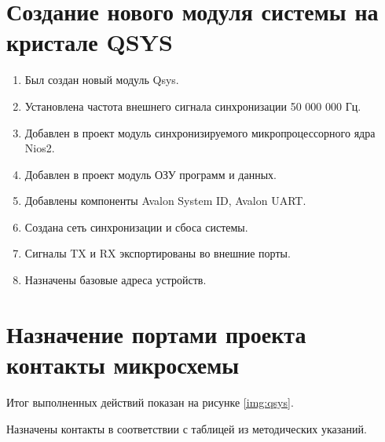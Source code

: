 \section*{\textbf{Создание нового модуля системы на кристале QSYS}}


\begin{enumerate}
	\item Был создан новый модуль Qsys.	
	\item Установлена частота внешнего сигнала синхронизации 50 000 000 Гц.
	\item Добавлен в проект модуль синхронизируемого микропроцессорного ядра Nios2.
	\item Добавлен в проект модуль ОЗУ программ и данных.
	\item Добавлены компоненты Avalon System ID, Avalon UART.
	\item Создана сеть синхронизации и сбоса системы.
	\item Сигналы TX и RX экспортированы во внешние порты.
	\item Назначены базовые адреса устройств.
\end{enumerate}

\section*{\textbf{Назначение портами проекта контакты микросхемы}} 

Итог выполненных действий показан на рисунке \ref{img:qsys}.
\begin{figure}[H]
	\captionsetup{justification=centering}
\end{figure}

Назначены контакты в соответствии с таблицей из методических указаний. 

